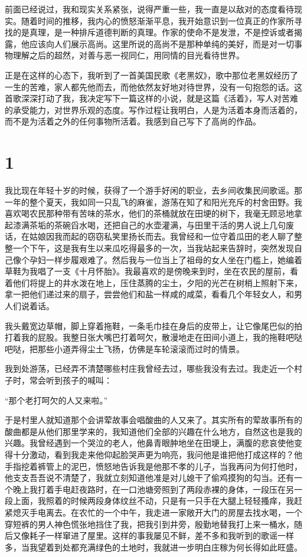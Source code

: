 \documentclass[12pt,UTF8]{ctexbook}
\begin{document}
前面已经说过，我和现实关系紧张，说得严重一些，我一直是以敌对的态度看待现实。随着时间的推移，我内心的愤怒渐渐平息，我开始意识到一位真正的作家所寻找的是真理，是一种排斥道德判断的真理。作家的使命不是发泄，不是控诉或者揭露，他应该向人们展示高尚。这里所说的高尚不是那种单纯的美好，而是对一切事物理解之后的超然，对善与恶一视同仁，用同情的目光看待世界。

正是在这样的心态下，我听到了一首美国民歌《老黑奴》，歌中那位老黑奴经历了一生的苦难，家人都先他而去，而他依然友好地对待世界，没有一句抱怨的话。这首歌深深打动了我，我决定写下一篇这样的小说，就是这篇《活着》，写人对苦难的承受能力，对世界乐观的态度。写作过程让我明白，人是为活着本身而活着的，而不是为活着之外的任何事物所活着。我感到自己写下了高尚的作品。

\mainmatter

\chapter{1}

我比现在年轻十岁的时候，获得了一个游手好闲的职业，去乡间收集民间歌谣。那一年的整个夏天，我如同一只乱飞的麻雀，游荡在知了和阳光充斥的村舍田野。我喜欢喝农民那种带有苦味的茶水，他们的茶桶就放在田埂的树下，我毫无顾忌地拿起漆满茶垢的茶碗舀水喝，还把自己的水壶灌满，与田里干活的男人说上几句废话，在姑娘因我而起的窃窃私笑里扬长而去。我曾经和一位守着瓜田的老人聊了整整一个下午，这是我有生以来瓜吃得最多的一次，当我站起来告辞时，突然发现自己像个孕妇一样步履艰难了。然后我与一位当上了祖母的女人坐在门槛上，她编着草鞋为我唱了一支《十月怀胎》。我最喜欢的是傍晚来到时，坐在农民的屋前，看着他们将提上的井水泼在地上，压住蒸腾的尘土，夕阳的光芒在树梢上照射下来，拿一把他们递过来的扇子，尝尝他们和盐一样咸的咸菜，看看几个年轻女人，和男人们说着话。

我头戴宽边草帽，脚上穿着拖鞋，一条毛巾挂在身后的皮带上，让它像尾巴似的拍打着我的屁股。我整日张大嘴巴打着呵欠，散漫地走在田间小道上，我的拖鞋吧哒吧哒，把那些小道弄得尘土飞扬，仿佛是车轮滚滚而过时的情景。

我到处游荡，已经弄不清楚哪些村庄我曾经去过，哪些我没有去过。我走近一个村子时，常会听到孩子的喊叫：

“那个老打呵欠的人又来啦。”

于是村里人就知道那个会讲荤故事会唱酸曲的人又来了。其实所有的荤故事所有的酸曲都是从他们那里学来的，我知道他们全部的兴趣在什么地方，自然这也是我的兴趣。我曾经遇到一个哭泣的老人，他鼻青眼肿地坐在田埂上，满腹的悲哀使他变得十分激动，看到我走来他仰起脸哭声更为响亮，我问他是谁把他打成这样的？他手指挖着裤管上的泥巴，愤怒地告诉我是他那不孝的儿子，当我再问为何打他时，他支支吾吾说不清楚了，我就立刻知道他准是对儿媳干了偷鸡摸狗的勾当。还有一个晚上我打着手电赶夜路时，在一口池塘旁照到了两段赤裸的身体，一段压在另一段上面，我照着的时候两段身体纹丝不动，只是有一只手在大腿上轻轻搔痒，我赶紧熄灭手电离去。在农忙的一个中午，我走进一家敞开大门的房屋去找水喝，一个穿短裤的男人神色慌张地挡住了我，把我引到井旁，殷勤地替我打上来一桶水，随后又像耗子一样窜进了屋里。这样的事我屡见不鲜，差不多和我听到的歌谣一样多，当我望着到处都充满绿色的土地时，我就进一步明白庄稼为何长得如此旺盛。
\end{document}
